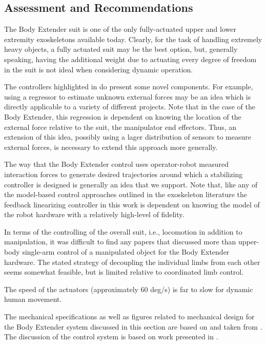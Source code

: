 \begin{refsection}
 
\subsection{Assessment and Recommendations}

The Body Extender suit is one of the only fully-actuated upper and lower extremity exoskeletons available today.  Clearly, for the task of handling extremely heavy objects, a fully actuated suit may be the best option, but, generally speaking, having the additional weight due to actuating every degree of freedom in the suit is not ideal when considering dynamic operation.  

The controllers highlighted in \cite{body_control_2012} do present some novel components.  For example, using a regressor to estimate unknown external forces may be an idea which is directly applicable to a variety of different projects.  Note that in the case of the Body Extender, this regression is dependent on knowing the location of the external force relative to the suit, the manipulator end effectors.  Thus, an extension of this idea, possibly using a lager distribution of sensors to measure external forces, is necessary to extend this approach more generally.  

The way that the Body Extender control uses operator-robot measured interaction forces to generate desired trajectories around which a stabilizing controller is designed is generally an idea that we support.  Note that, like any of the model-based control approaches outlined in the exoskeleton literature the feedback linearizing controller in this work is dependent on knowing the model of the robot hardware with a relatively high-level of fidelity.  

In terms of the controlling of the overall suit, i.e., locomotion in addition to manipulation, it was difficult to find any papers that discussed more than upper-body single-arm control of a manipulated object for the Body Extender hardware.  The stated strategy of decoupling the individual limbs from each other seems somewhat feasible, but is limited relative to coordinated limb control. 

The speed of the actuators (approximately 60 deg/s) is far to slow for
dynamic human movement.

 The mechanical specifications as well as figures related to mechanical design for the Body Extender system discussed in this section are based on and taken from \cite{body_design_2011}.  The discussion of the control system is based on work presented in \cite{body_control_2012}.

\printbibliography[heading=subbibliography]

\end{refsection}
  
